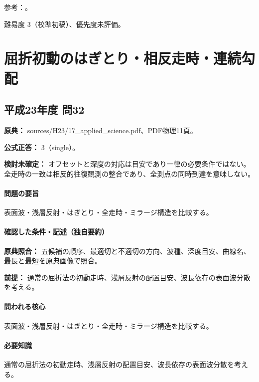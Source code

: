 \par 参考：\cite{segj_integrated2017,jica_refraction2015,japansea_spac2017}。

\par 難易度 3（校準初稿）、優先度未評価。

\section{屈折初動のはぎとり・相反走時・連続勾配}

\subsection{平成23年度 問32}
\label{q:h23-reg-applied-32}

\noindent\textbf{原典：} sources/H23/17\_applied\_science.pdf、PDF物理11頁。

\textbf{公式正答：} 3（single）。

\par\textbf{検討未確定：} オフセットと深度の対応は目安であり一律の必要条件ではない。全走時の一致は相反的往復観測の整合であり、全測点の同時到達を意味しない。

\paragraph{問題の要旨} 表面波・浅層反射・はぎとり・全走時・ミラージ構造を比較する。

\paragraph{確認した条件・記述（独自要約）}\mbox{}\par

\noindent\textbf{原典照合：} 五候補の順序、最適切と不適切の方向、波種、深度目安、曲線名、最長と最短を原典画像で照合。\par

\noindent\textbf{前提：} 通常の屈折法の初動走時、浅層反射の配置目安、波長依存の表面波分散を考える。\par

\paragraph{問われる核心} 表面波・浅層反射・はぎとり・全走時・ミラージ構造を比較する。

\paragraph{必要知識} 通常の屈折法の初動走時、浅層反射の配置目安、波長依存の表面波分散を考える。

